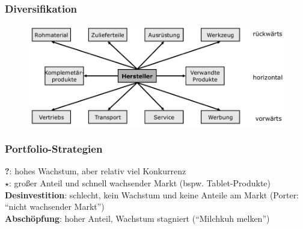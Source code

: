 \documentclass[a4paper,11pt, twoside]{article}
\begin{document}
\subsubsection*{Diversifikation} 
\begin{figure}[h]
 \begin{center}
   \includegraphics[scale=0.3]{bilder/diversifikation.png}
 \end{center}
\end{figure}
\newpage

\subsubsection*{Portfolio-Strategien} 

\textbf{?}: hohes Wachstum, aber relativ viel Konkurrenz\\
\textbf{$\star$}: großer Anteil und schnell wachsender Markt (bspw. Tablet-Produkte)\\
\textbf{Desinvestition}: schlecht, kein Wachstum und keine Anteile am Markt (Porter: "`nicht wachsender Markt"')\\ 
\textbf{Abschöpfung}: hoher Anteil, Wachstum stagniert ("`Milchkuh melken"')
\end{document}
